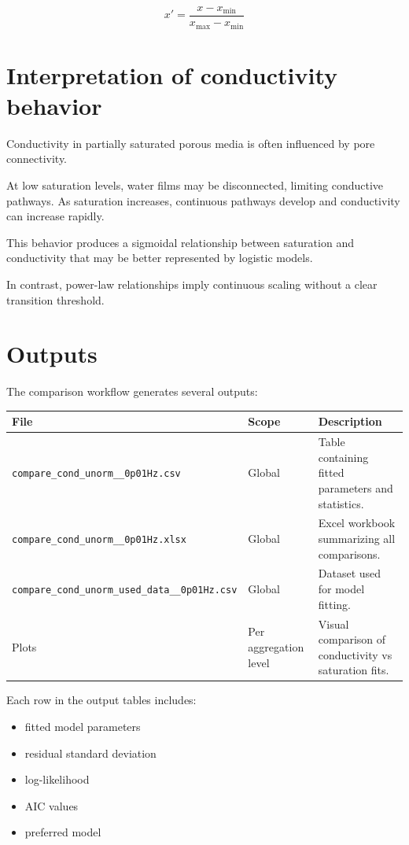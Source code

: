 \documentclass[11pt]{article}
\begin{document}
\[
x' = \frac{x-x_{\min}}{x_{\max}-x_{\min}}
\]

\section{Interpretation of conductivity behavior}

Conductivity in partially saturated porous media is often influenced by pore connectivity.

At low saturation levels, water films may be disconnected, limiting conductive pathways. As saturation increases, continuous pathways develop and conductivity can increase rapidly.

This behavior produces a sigmoidal relationship between saturation and conductivity that may be better represented by logistic models.

In contrast, power-law relationships imply continuous scaling without a clear transition threshold.

\section{Outputs}

The comparison workflow generates several outputs:

\begin{longtable}{p{} p{} p{}}
\toprule
\textbf{File} & \textbf{Scope} & \textbf{Description}\\
\midrule
\endhead

\texttt{compare\_cond\_unorm\_\_0p01Hz.csv} & Global & Table containing fitted parameters and statistics.\\

\texttt{compare\_cond\_unorm\_\_0p01Hz.xlsx} & Global & Excel workbook summarizing all comparisons.\\

\texttt{compare\_cond\_unorm\_used\_data\_\_0p01Hz.csv} & Global & Dataset used for model fitting.\\

Plots & Per aggregation level & Visual comparison of conductivity vs saturation fits.\\

\bottomrule
\end{longtable}

Each row in the output tables includes:

\begin{itemize}

\item fitted model parameters
\item residual standard deviation
\item log-likelihood
\item AIC values
\item preferred model

\end{itemize}
\end{document}
